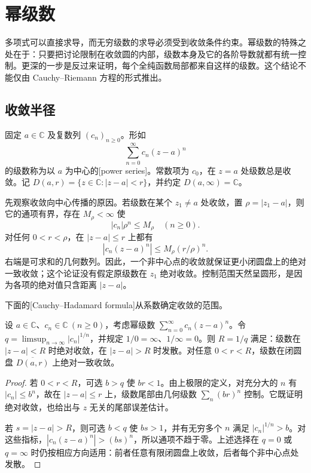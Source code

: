 \section{幂级数}
\label{b3:sec:0102}

多项式可以直接求导，而无穷级数的求导必须受到收敛条件约束。幂级数的特殊之处在于：只要把讨论限制在收敛圆的内部，级数本身及它的各阶导数就都有统一控制。更深的一步是反过来证明，每个全纯函数局部都来自这样的级数。这个结论不能仅由 Cauchy--Riemann 方程的形式推出。

\subsection{收敛半径}
\label{b3:subsec:010201}

固定 \(a\in\mathbb C\) 及复数列 \((c_n)_{n\geq0}\)。形如
\[
\sum_{n=0}^\infty c_n(z-a)^n
\]
的级数称为以 \(a\) 为中心的[power series]。常数项为 \(c_0\)，在 \(z=a\) 处级数总是收敛。记 \(D(a,r)=\{z\in\mathbb C:|z-a|<r\}\)，并约定 \(D(a,\infty)=\mathbb C\)。

\ProseParagraphBreak

先观察收敛向中心传播的原因。若级数在某个 \(z_1\ne a\) 处收敛，置 \(\rho=|z_1-a|\)，则它的通项有界，存在 \(M_\rho<\infty\) 使
\[
 |c_n|\rho^n\le M_\rho\quad(n\ge0).
\]
对任何 \(0<r<\rho\)，在 \(|z-a|\le r\) 上都有
\[
 |c_n(z-a)^n|\le M_\rho(r/\rho)^n.
\]
右端是可求和的几何数列。因此，一个非中心点的收敛就保证更小闭圆盘上的绝对一致收敛；这个论证没有假定原级数在 \(z_1\) 绝对收敛。控制范围天然呈圆形，是因为各项的绝对值只含距离 \(|z-a|\)。

\ProseParagraphBreak

下面的[Cauchy--Hadamard formula]从系数确定收敛的范围。

\begin{theorem}\label{b3:thm:01-power-radius}
设 \(a\in\mathbb C\)、\(c_n\in\mathbb C\ (n\ge0)\)，考虑幂级数 \(\sum_{n=0}^{\infty}c_n(z-a)^n\)。令 \(q=\limsup_{n\to\infty}|c_n|^{1/n}\)，并规定 \(1/0=\infty\)、\(1/\infty=0\)。则 \(R=1/q\) 满足：级数在 \(|z-a|<R\) 时绝对收敛，在 \(|z-a|>R\) 时发散。对任意 \(0<r<R\)，级数在闭圆盘 \(\overline{D(a,r)}\) 上绝对一致收敛。
\end{theorem}
\begin{proof}
若 \(0<r<R\)，可选 \(b>q\) 使 \(br<1\)。由上极限的定义，对充分大的 \(n\) 有 \(|c_n|\leq b^n\)，故在 \(|z-a|\leq r\) 上，级数尾部由几何级数 \(\sum_n(br)^n\) 控制。它既证明绝对收敛，也给出与 \(z\) 无关的尾部误差估计。

若 \(s=|z-a|>R\)，则可选 \(b<q\) 使 \(bs>1\)，并有无穷多个 \(n\) 满足 \(|c_n|^{1/n}>b\)。对这些指标，\(|c_n(z-a)^n|>(bs)^n\)，所以通项不趋于零。上述选择在 \(q=0\) 或 \(q=\infty\) 时仍按相应方向适用：前者任意有限闭圆盘上收敛，后者每个非中心点处发散。
\end{proof}

